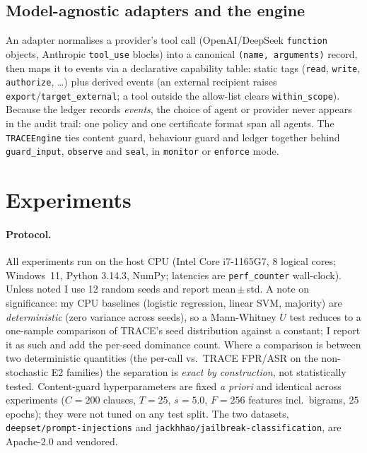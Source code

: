 \documentclass[11pt]{article}
\begin{document}
\subsection{Model-agnostic adapters and the engine}
\label{sec:adapters}

An adapter normalises a provider's tool call (OpenAI/DeepSeek
\texttt{function} objects, Anthropic \texttt{tool\_use} blocks) into a
canonical \texttt{(name, arguments)} record, then maps it to events via a
declarative capability table: static tags (\texttt{read}, \texttt{write},
\texttt{authorize}, \dots) plus derived events (an external recipient raises
\texttt{export}/\texttt{target\_external}; a tool outside the allow-list clears
\texttt{within\_scope}). Because the ledger records \emph{events}, the choice of
agent or provider never appears in the audit trail: one policy and one
certificate format span all agents. The \texttt{TRACEEngine} ties content guard,
behaviour guard and ledger together behind \texttt{guard\_input}, \texttt{observe}
and \texttt{seal}, in \texttt{monitor} or \texttt{enforce} mode.

\section{Experiments}
\label{sec:exp}

\paragraph{Protocol.} All experiments run on the host CPU (Intel Core
i7-1165G7, 8 logical cores; Windows~11, Python 3.14.3, NumPy; latencies are
\texttt{perf\_counter} wall-clock). Unless noted I use 12 random seeds and
report mean\,$\pm$\,std. A note on significance: my CPU baselines (logistic
regression, linear SVM, majority) are \emph{deterministic} (zero variance
across seeds), so a Mann-Whitney $U$ test reduces to a one-sample comparison of
TRACE's seed distribution against a constant; I report it as such and add the
per-seed dominance count. Where a comparison is between two deterministic
quantities (the per-call vs.\ TRACE FPR/ASR on the non-stochastic E2 families)
the separation is \emph{exact by construction}, not statistically tested.
Content-guard hyperparameters are fixed \emph{a
priori} and identical across experiments ($C{=}200$ clauses, $T{=}25$, $s{=}5.0$,
$F{=}256$ features incl.\ bigrams, $25$ epochs); they were not tuned on any test
split. The two datasets, \texttt{deepset/prompt-injections} and
\texttt{jackhhao/jailbreak-classification}, are Apache-2.0 and vendored.
\end{document}
